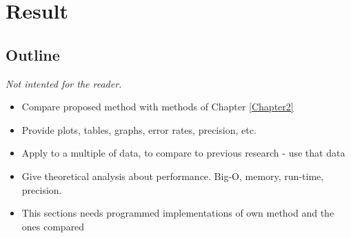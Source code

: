 
\chapter{Result}

\label{Chapter5} %


\section{Outline}
\emph{Not intented for the reader.}
\begin{itemize}
  \item Compare proposed method with methods of Chapter \ref{Chapter2}
  \item Provide plots, tables, graphs, error rates, precision, etc.
  \item Apply to a multiple of data, to compare to previous research - use that data
  \item Give theoretical analysis about performance. Big-O, memory, run-time, precision.
  \item This sections needs programmed implementations of own method and the ones compared
\end{itemize}